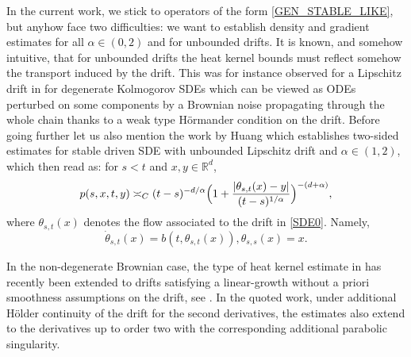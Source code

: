 \documentclass[JEP,XML,SOM,Unicode,published]{cedram}
\theoremstyle{plain}
\theoremstyle{definition}
\newcommand\mR{\mathbb{R}}
\newcommand\1{{\mathbf{1}}}
\begin{document}
In the current work, {we stick to operators of the form \eqref{GEN_STABLE_LIKE}, but anyhow face two difficulties:} we want to establish {density and} gradient estimates for all $\alpha\in (0,2) $ and for unbounded drifts. It is known, and somehow intuitive, that for unbounded drifts the heat kernel bounds must reflect somehow the transport induced by the drift. This was for instance observed for a Lipschitz drift in \cite{dela:meno:10} for degenerate Kolmogorov SDEs which can be viewed as ODEs perturbed on some components by a Brownian noise propagating through the whole chain thanks to a weak type Hörmander condition on the drift.
Before going further let us also mention the work by Huang \cite{huan:15}
which establishes two-sided estimates for stable driven SDE with unbounded Lipschitz drift and $\alpha\in(1,2)$,
which then read as: for $s<t$ and $x,y\in\mR^d$,
\begin{equation}
\label{SECOND_TW}
p(s,x,t,y)\asymp_C (t-s)^{-d/\alpha} \Bigl(1+\frac{|\theta_{s,t}(x)-y|}{(t-s)^{1/\alpha}}\Bigr)^{-(d+\alpha)},
\end{equation}
where $\theta_{s,t}(x) $ denotes the flow associated to the drift in \eqref{SDE0}. Namely,
\[
\dot \theta_{s,t}(x)=b(t,\theta_{s,t}(x)), \theta_{s,s}(x)=x.
\]

In the non-degenerate Brownian case, the type of heat kernel estimate in \cite{dela:meno:10} has recently been extended to drifts satisfying a linear-growth without a priori smoothness assumptions on the drift, see \cite{meno:pesc:zhan:20}. In the quoted work, under additional Hölder continuity of the drift for the second derivatives, the estimates also extend to the derivatives up to order two with the corresponding additional parabolic singularity.
\end{document}
